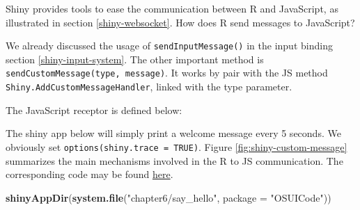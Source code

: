 \documentclass[
]{book}
\newenvironment{Shaded}{\begin{snugshade}}{\end{snugshade}}
\newcommand{\AttributeTok}[1]{\textcolor[rgb]{0.77,0.63,0.00}{#1}}
\newcommand{\ControlFlowTok}[1]{\textcolor[rgb]{0.13,0.29,0.53}{\textbf{#1}}}
\newcommand{\DataTypeTok}[1]{\textcolor[rgb]{0.13,0.29,0.53}{#1}}
\newcommand{\KeywordTok}[1]{\textcolor[rgb]{0.13,0.29,0.53}{\textbf{#1}}}
\newcommand{\NormalTok}[1]{#1}
\newcommand{\OperatorTok}[1]{\textcolor[rgb]{0.81,0.36,0.00}{\textbf{#1}}}
\newcommand{\SpecialCharTok}[1]{\textcolor[rgb]{0.00,0.00,0.00}{#1}}
\newcommand{\StringTok}[1]{\textcolor[rgb]{0.31,0.60,0.02}{#1}}
\newcommand{\VariableTok}[1]{\textcolor[rgb]{0.00,0.00,0.00}{#1}}
\newcommand{\VerbatimStringTok}[1]{\textcolor[rgb]{0.31,0.60,0.02}{#1}}
\begin{document}
Shiny provides tools to ease the communication between R and JavaScript, as illustrated in section \ref{shiny-websocket}. How does R send messages to JavaScript?

We already discussed the usage of \texttt{sendInputMessage()} in the input binding section \ref{shiny-input-system}. The other important method is \texttt{sendCustomMessage(type,\ message)}. It works by pair with the JS method \texttt{Shiny.AddCustomMessageHandler}, linked with the type parameter.

\begin{Shaded}
\end{Shaded}

The JavaScript receptor is defined below:

\begin{Shaded}
\end{Shaded}

The shiny app below will simply print a welcome message every 5 seconds. We obviously set \texttt{options(shiny.trace\ =\ TRUE)}. Figure \ref{fig:shiny-custom-message} summarizes the main mechanisms involved in the R to JS communication. The corresponding code may be found \href{https://github.com/DivadNojnarg/outstanding-shiny-ui-code/blob/master/R/say_hello.R}{here}.

\begin{Shaded}
\begin{Highlighting}[]
\KeywordTok{shinyAppDir}\NormalTok{(}\KeywordTok{system.file}\NormalTok{(}\StringTok{"chapter6/say_hello"}\NormalTok{, }\DataTypeTok{package =} \StringTok{"OSUICode"}\NormalTok{))}
\end{Highlighting}
\end{Shaded}
\end{document}
